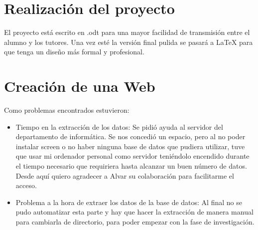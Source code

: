 \section{Realización del proyecto}
El proyecto está escrito en .odt para una mayor facilidad de transmisión entre el alumno y los tutores. Una vez esté la versión final pulida se pasará a LaTeX para que tenga un diseño más formal y profesional.

\section{Creación de una Web}
Como problemas encontrados estuvieron:

\begin{itemize}
	\item Tiempo en la extracción de los datos: Se pidió ayuda al servidor del departamento de informática. Se nos concedió un espacio, pero al no poder instalar screen o no haber ninguna base de datos que pudiera utilizar, tuve que usar mi ordenador personal como servidor teniéndolo encendido durante el tiempo necesario que requiriera hasta alcanzar un buen número de datos. Desde aquí quiero agradecer a Alvar su colaboración para facilitarme el acceso.
	\item Problema a la hora de extraer los datos de la base de datos: Al final no se pudo automatizar esta parte y hay que hacer la extracción de manera manual para cambiarla de directorio, para poder empezar con la fase de investigación.
\end{itemize}